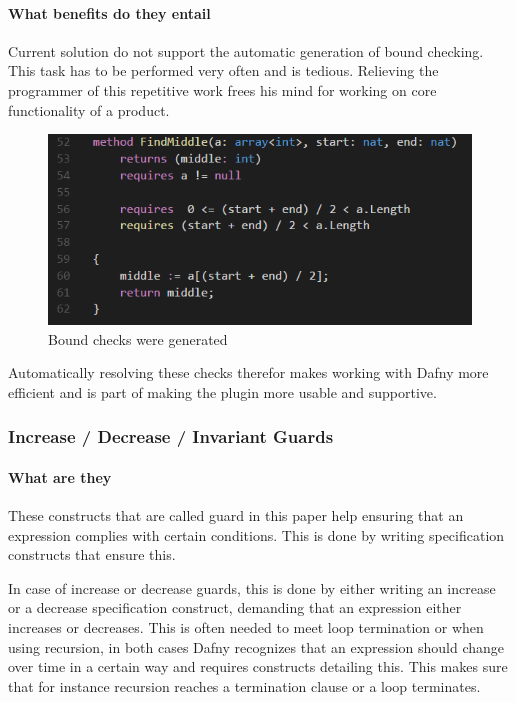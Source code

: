 \paragraph{What benefits do they entail}
Current solution do not support the automatic generation of bound checking. This task has to be performed very often and is tedious. Relieving the programmer of this repetitive work frees his mind for working on core functionality of a product. \newline

\begin{figure}[H]
	\centering
	\includegraphics[width=1\textwidth]{img/boundCheck}
	\caption{Bound checks were generated}
	\label{fig:dfindexInBound}
\end{figure}

Automatically resolving these checks therefor makes working with Dafny more efficient and is part of making the plugin more usable and supportive.

\subsubsection{Increase / Decrease / Invariant Guards}
\paragraph{What are they}
These constructs that are called guard in this paper help ensuring that an expression complies with certain conditions. This is done by writing specification constructs that ensure this. 
\newline

In case of increase or decrease guards, this is done by either writing an increase or a decrease specification construct, demanding that an expression either increases or decreases. This is often needed to meet loop termination or when using recursion, in both cases Dafny recognizes that an expression should change over time in a certain way and requires constructs detailing this. This makes sure that for instance recursion reaches a termination clause or a loop terminates. \newline

